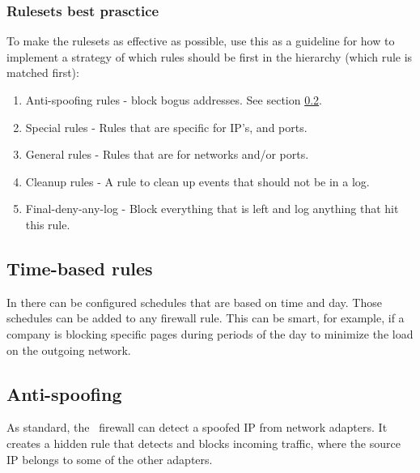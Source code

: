 \subsubsection{Rulesets best prasctice}
To make the rulesets as effective as possible, use this as a guideline for how to implement a strategy of which rules should be first in the hierarchy (which rule is matched first):
\begin{enumerate}
    \item Anti-spoofing rules - block bogus addresses. See section \ref{anti_spoofing}.
    \item Special rules - Rules that are specific for IP's, and ports.
    \item General rules - Rules that are for networks and/or ports.
    \item Cleanup rules - A rule to clean up events that should not be in a log.
    \item Final-deny-any-log - Block everything that is left and log anything that hit this rule.
\end{enumerate}

\subsection{Time-based rules}
In  there can be configured schedules that are based on time and day. Those schedules can be added to any firewall rule. This can be smart, for example, if a company is blocking specific pages during periods of the day to minimize the load on the outgoing network.


\subsection{Anti-spoofing} \label{anti_spoofing}
As standard, the \opnsense\ firewall can detect a spoofed IP from network adapters. It creates a hidden rule that detects and blocks incoming traffic, where the source IP belongs to some of the other adapters.


